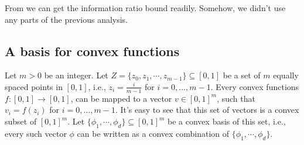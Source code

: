 From  we can get the information ratio bound readily.
Somehow, we didn't use any parts of the previous analysis.

\newpage
\subsection{A basis for convex functions}
Let $m>0$ be an integer.
Let $Z = \{z_0, z_1, \cdots, z_{m-1}\} \subseteq [0,1]$ be a set of
$m$ equally spaced points in $[0,1]$, i.e.,
$z_i = \frac{i}{m-1}$ for $i=0, \ldots, m-1$.
Every convex functions $f:[0,1] \to [0,1]$,
can be mapped to a vector $ v \in [0,1]^m$,
such that $v_i = f(z_i)$ for $i=0, \ldots, m-1$.
It's easy to see that this set of vectors is a convex subset of $[0,1]^m$.
Let $\{\phi_1, \cdots, \phi_d\} \subseteq [0,1]^m$ be a convex basis of this set,
i.e., every such vector $\phi$ can be written as
a convex combination of $\{\phi_1, \cdots, \phi_d\}$.

